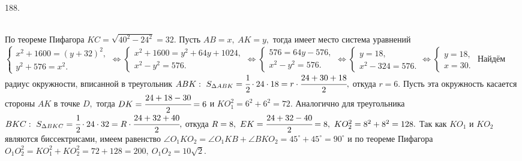 188. \begin{figure}[ht!]
\end{figure}\\
По теореме Пифагора $KC=\sqrt{40^2-24^2}=32.$ Пусть $AB=x,\ AK=y,$ тогда имеет место система уравнений $\begin{cases}x^2+1600=(y+32)^2,\\
y^2+576=x^2.\end{cases}\Leftrightarrow\begin{cases}x^2+1600=y^2+64y+1024,\\
x^2-y^2=576.\end{cases}\Leftrightarrow\begin{cases}576=64y-576,\\
x^2-y^2=576.\end{cases}\Leftrightarrow\begin{cases}y=18,\\
x^2-324=576.\end{cases}\Leftrightarrow\begin{cases}y=18,\\
x=30.\end{cases}$ Найдём радиус окружности, вписанной в треугольник $ABK:\ S_{\Delta ABK}=\cfrac{1}{2}\cdot24\cdot18=r\cdot\cfrac{24+30+18}{2},$ откуда $r=6.$ Пусть эта окружность касается стороны $AK$ в точке $D,$ тогда $DK=\cfrac{24+18-30}{2}=6$ и $KO_1^2=6^2+6^2=72.$ Аналогично для треугольника $BKC:\ S_{\Delta BKC}=\cfrac{1}{2}\cdot24\cdot32=R\cdot\cfrac{24+32+40}{2},$ откуда $R=8,\ EK=\cfrac{24+32-40}{2}=8,\ KO_2^2=8^2+8^2=128.$ Так как $KO_1$ и $KO_2$ являются биссектрисами, имеем равенство $\angle O_1KO_2=\angle O_1KB+\angle BKO_2=45^\circ+45^\circ=90^\circ$ и по теореме Пифагора $O_1O_2^2=KO_1^2+KO_2^2=72+128=200,\ O_1O_2=10\sqrt{2}.$\\
